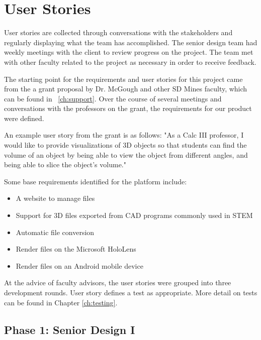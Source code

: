 \section{User Stories}

User stories are collected through conversations with the stakeholders and
regularly displaying what the team has accomplished. The senior design team had
weekly meetings with the client to review progress on the project. The team met
with other faculty related to the project as necessary in order to receive
feedback.

The starting point for the requirements and user stories for this project came
from the a grant proposal by Dr. McGough and other SD Mines faculty,
which can be found in ~\autoref{ch:support}. Over the course of several
meetings and conversations with the professors on the grant, the
requirements for our product were defined.

An example user story from the grant is as follows: "As a Calc III
professor, I would like to provide visualizations of 3D objects so that
students can find the volume of an object by being able to view the object
from different angles, and being able to slice the object's volume."

Some base requirements identified for the platform include:
\begin{itemize}
	\item A website to manage files
	\item Support for 3D files exported from CAD programs commonly used in STEM
	\item Automatic file conversion
	\item Render files on the Microsoft HoloLens
	\item Render files on an Android mobile device
\end{itemize}

At the advice of faculty advisors, the user stories were grouped into three 
development rounds. User story defines a test as appropriate. More detail on tests can be found in Chapter \ref{ch:testing}.

\subsection{Phase 1: Senior Design I}

